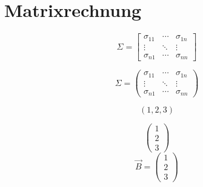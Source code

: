 
\section{Matrixrechnung}
 $$
\Sigma=\left[
\begin{array}{ccc}
   \sigma_{11} & \cdots & \sigma_{1n} \\
   \vdots & \ddots & \vdots \\
   \sigma_{n1} & \cdots & \sigma_{nn}
\end{array}
\right]
$$

 $$
\Sigma=\left(
\begin{array}{ccc}
   \sigma_{11} & \cdots & \sigma_{1n} \\
   \vdots & \ddots & \vdots \\
   \sigma_{n1} & \cdots & \sigma_{nn}
\end{array}
\right)
$$


\newcommand*{\rowvec}[1]{\left( #1\right)}
\newcommand*{\rowvecVert}[1]{\left(\begin{array}{c}#1\end{array}\right)}

$$
\rowvec{1,2,3}
$$

$$
\left(
\begin{array}{c}
1 \\ 2 \\ 3
\end{array}
\right)
$$
$$
\vec{B} = \rowvecVert{1 \\ 2 \\ 3}
$$